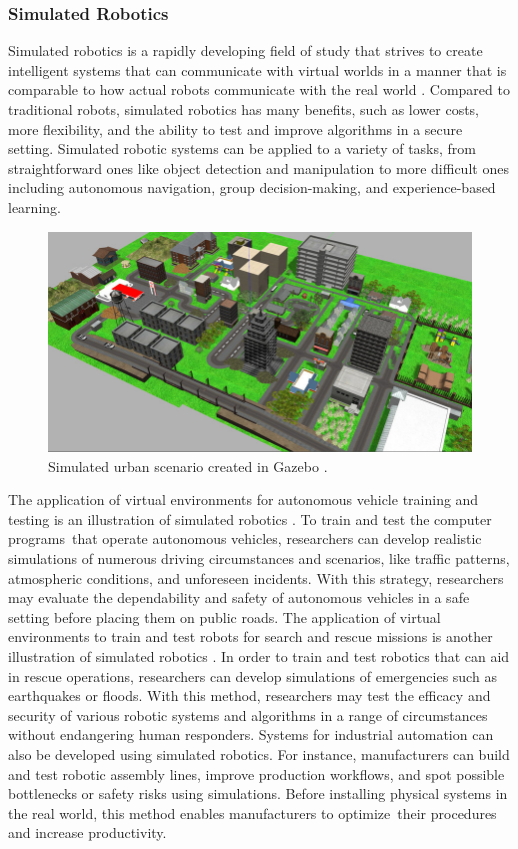 \documentclass[12pt,oneside]{article}
\begin{document}
\subsubsection{Simulated Robotics} 
Simulated robotics is a rapidly developing field of study that strives to create intelligent systems that can communicate with virtual worlds in a manner that is comparable to how actual robots communicate with the real world \cite{4_choi2021use}. Compared to traditional robots, simulated robotics has many benefits, such as lower costs, more flexibility, and the ability to test and improve algorithms in a secure setting. Simulated robotic systems can be applied to a variety of tasks, from straightforward ones like object detection and manipulation to more difficult ones including autonomous navigation, group decision-making, and experience-based learning.  
\begin{figure}[H]
\centering
\includegraphics[width=0.9\linewidth]{gazebo_city}
\caption{Simulated urban scenario created in Gazebo \cite{yigit2020real}.}
\label{fig:gazebocity}
\end{figure}

The application of virtual environments for autonomous vehicle training and testing is an illustration of simulated robotics \cite{5_elmquist2021sensor}. To train and test the computer programs that operate autonomous vehicles, researchers can develop realistic simulations of numerous driving circumstances and scenarios, like traffic patterns, atmospheric conditions, and unforeseen incidents. With this strategy, researchers may evaluate the dependability and safety of autonomous vehicles in a safe setting before placing them on public roads. The application of virtual environments to train and test robots for search and rescue missions is another illustration of simulated robotics \cite{6_sampedro2019fully}. In order to train and test robotics that can aid in rescue operations, researchers can develop simulations of emergencies such as earthquakes or floods. With this method, researchers may test the efficacy and security of various robotic systems and algorithms in a range of circumstances without endangering human responders.
Systems for industrial automation can also be developed using simulated robotics. For instance, manufacturers can build and test robotic assembly lines, improve production workflows, and spot possible bottlenecks or safety risks using simulations. Before installing physical systems in the real world, this method enables manufacturers to optimize their procedures and increase productivity.
\end{document}

